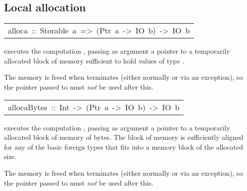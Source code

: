 \subsection{Local allocation
}
\begin{haddockdesc}
\item[\begin{tabular}{@{}l}
alloca\ ::\ Storable\ a\ =>\ (Ptr\ a\ ->\ IO\ b)\ ->\ IO\ b
\end{tabular}]\haddockbegindoc
{} executes the computation , passing as argument
 a pointer to a temporarily allocated block of memory sufficient to
 hold values of type .
\par
The memory is freed when  terminates (either normally or via an
 exception), so the pointer passed to  must \emph{not} be used after this.
\par

\end{haddockdesc}
\begin{haddockdesc}
\item[\begin{tabular}{@{}l}
allocaBytes\ ::\ Int\ ->\ (Ptr\ a\ ->\ IO\ b)\ ->\ IO\ b
\end{tabular}]\haddockbegindoc
{} executes the computation , passing as argument
 a pointer to a temporarily allocated block of memory of  bytes.
 The block of memory is sufficiently aligned for any of the basic
 foreign types that fits into a memory block of the allocated size.
\par
The memory is freed when  terminates (either normally or via an
 exception), so the pointer passed to  must \emph{not} be used after this.
\par

\end{haddockdesc}
